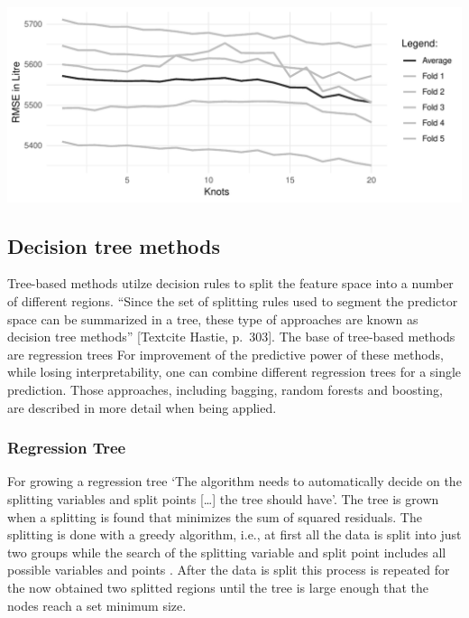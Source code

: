 \documentclass[11pt,]{article}
\begin{document}
\includegraphics{../00_data/output_paper/08_splines.pdf}

\hypertarget{decision-tree-methods}{%
\subsection{Decision tree methods}\label{decision-tree-methods}}

Tree-based methods utilze decision rules to split the feature space into
a number of different regions. ``Since the set of splitting rules used
to segment the predictor space can be summarized in a tree, these type
of approaches are known as decision tree methods'' {[}Textcite Hastie,
p.~303{]}. The base of tree-based methods are regression trees For
improvement of the predictive power of these methods, while losing
interpretability, one can combine different regression trees for a
single prediction. Those approaches, including bagging, random forests
and boosting, are described in more detail when being applied.

\hypertarget{regression-tree}{%
\subsubsection{Regression Tree}\label{regression-tree}}

For growing a regression tree `The algorithm needs to automatically
decide on the splitting variables and split points {[}\ldots{}{]} the
tree should have'\autocite[p.349]{Hastie2013}. The tree is grown when a
splitting is found that minimizes the sum of squared residuals. The
splitting is done with a greedy algorithm, i.e., at first all the data
is split into just two groups while the search of the splitting variable
and split point includes all possible variables and points
\autocite[cf.~][p.349]{Hastie2013}. After the data is split this process
is repeated for the now obtained two splitted regions until the tree is
large enough that the nodes reach a set minimum size.
\end{document}
